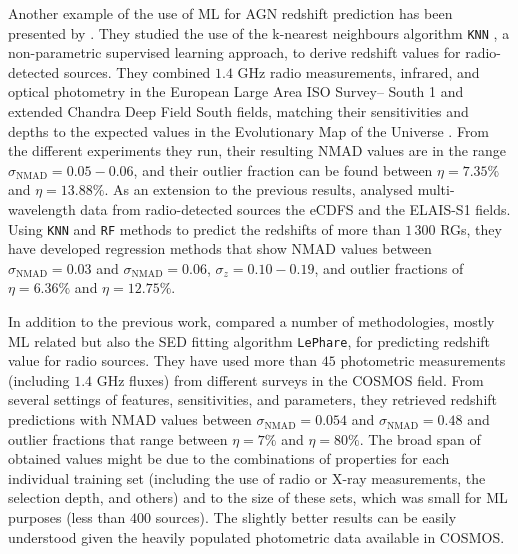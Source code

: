 \documentclass{aa}
\begin{document}
Another example of the use of ML for AGN redshift prediction has been presented by \citet{2019PASP..131j8003L}. They studied the use of the k-nearest neighbours algorithm \verb|KNN| \citep{1053964}, a non-parametric supervised learning approach, to derive redshift values for radio-detected sources. They combined $1.4$ GHz radio measurements, infrared, and optical photometry in the European Large Area ISO Survey– South 1 \citep[ELAIS-S1;][]{2000MNRAS.316..749O} and extended Chandra Deep Field South \citep[eCDFS;][]{2005ApJS..161...21L} fields, matching their sensitivities and depths to the expected values in the Evolutionary Map of the Universe \citep[EMU;][]{2011PASA...28..215N}. From the different experiments they run, their resulting NMAD values are in the range ${\sigma_{\mathrm{NMAD}} = 0.05 - 0.06}$, and their outlier fraction can be found between ${\eta = 7.35 \%}$ and ${\eta = 13.88 \%}$. 
As an extension to the previous results, \citet{LUKEN2022100557} analysed multi-wavelength data from radio-detected sources the eCDFS and the ELAIS-S1 fields. Using \texttt{KNN} and \texttt{RF} methods to predict the redshifts of more than $1\,300$ RGs, they have developed regression methods that show NMAD values between ${\sigma_{\mathrm{NMAD}} = 0.03}$ and ${\sigma_{\mathrm{NMAD}} = 0.06}$, ${\sigma_{z} = 0.10 - 0.19}$, and outlier fractions of ${\eta = 6.36 \%}$ and ${\eta = 12.75 \%}$.

In addition to the previous work, \citet{2019PASP..131j8004N} compared a number of methodologies, mostly ML related but also the SED fitting algorithm \texttt{LePhare}, for predicting redshift value for radio sources. They have used more than $45$ photometric measurements (including $1.4$ GHz fluxes) from different surveys in the COSMOS field. From several settings of features, sensitivities, and parameters, they retrieved redshift predictions with NMAD values between ${\sigma_{\mathrm{NMAD}} = 0.054}$ and ${\sigma_{\mathrm{NMAD}} = 0.48}$ and outlier fractions that range between ${\eta = 7 \%}$ and ${\eta = 80 \%}$. The broad span of obtained values might be due to the combinations of properties for each individual training set (including the use of radio or X-ray measurements, the selection depth, and others) and to the size of these sets, which was small for ML purposes (less than $400$ sources). The slightly better results can be easily understood given the heavily populated photometric data available in COSMOS.
\end{document}
